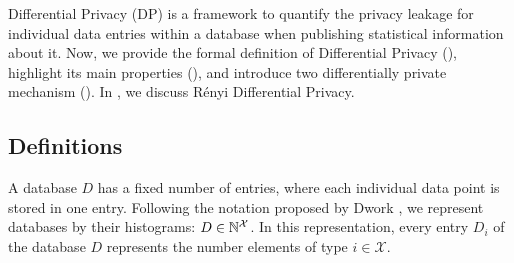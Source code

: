 Differential Privacy (DP) is a framework to quantify the privacy leakage for individual data entries within a database when publishing statistical information about it.
Now, we provide the formal definition of Differential Privacy (), highlight its main properties (), and introduce two differentially private mechanism ().
In , we discuss R\'enyi Differential Privacy.

%
%


\subsection{Definitions}\label{subsec:background-dp-definitions}
A database $D$ has a fixed number of entries, where each individual data point is stored in one entry.
Following the notation proposed by Dwork \etal \cite{dwork2014algorithmic}, we represent databases by their histograms: $D \in \mathbb{N}^\mathcal{X}$. 
In this representation, every entry $D_i$ of the database $D$ represents the number elements of type $i \in \mathcal{X}$.


